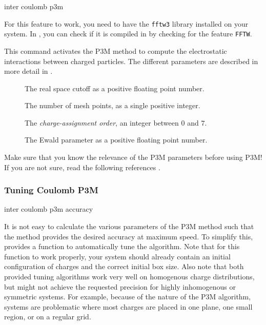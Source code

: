 \begin{essyntax}
  inter coulomb  p3m 
     
  \begin{features}
  \end{features}
\end{essyntax}

For this feature to work, you need to have the \texttt{fftw3} library
installed on your system. In \es{}, you can check if it is compiled in
by checking for the feature \texttt{FFTW}.

This command activates the P3M method to compute the electrostatic
interactions between charged particles.  The different parameters are
described in more detail in \cite{deserno98a}.
\begin{description}
\item[] The real space cutoff as a positive
  floating point number.
\item[] The number of mesh points, as a single positive
  integer.
\item[] The \emph{charge-assignment order}, an integer
  between $0$ and $7$.
\item[] The Ewald parameter as a positive floating point
  number.
\end{description}

Make sure that you know the relevance of the P3M parameters before
using P3M! If you are not sure, read the following references
\cite{ewald21, hockney88, kolafa92, deserno98, deserno98a, deserno00,
  deserno00a, cerda08a}.

\subsubsection{Tuning Coulomb P3M}
\label{ssec:tunep3m}
\begin{essyntax}
  inter coulomb  p3m 
  accuracy \\
  \begin{features}
  \end{features}
\end{essyntax}

It is not easy to calculate the various parameters of the P3M method
such that the method provides the desired accuracy at maximum speed.
To simplify this, \es{} provides a function to automatically tune the
algorithm.  Note that for this function to work properly, your system
should already contain an initial configuration of charges and the
correct initial box size. Also note that both provided tuning
algorithms work very well on homogenous charge distributions, but
might not achieve the requested precision for highly inhomogenous or
symmetric systems. For example, because of the nature of the P3M
algorithm, systems are problematic where most charges are placed in
one plane, one small region, or on a regular grid.

